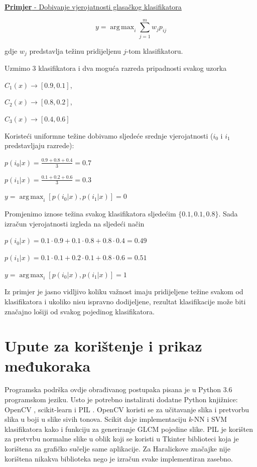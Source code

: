 \documentclass[times, utf8, zavrsni, numeric]{fer}
\DeclareMathOperator*{\argmax}{arg\,max}
\begin{document}
\newpage

\underline{\textbf{Primjer} - Dobivanje vjerojatnosti glasačkog klasifikatora}

\[y = \argmax_i \sum_{j=1}^mw_jp_{ij}\]

gdje \(w_j\) predstavlja težinu pridijeljenu \(j\)-tom klasifikatoru.

\bigbreak

Uzmimo 3 klasifikatora i dva moguća razreda pripadnosti svakog uzorka 

\begin{center}
\(C_1(x) \rightarrow [0.9,0.1]\),
\end{center}
\begin{center}
\(C_2(x) \rightarrow [0.8,0.2]\),
\end{center}
\begin{center}
\(C_3(x) \rightarrow [0.4,0.6]\)
\end{center}

Koristeći uniformne težine dobivamo sljedeće srednje vjerojatnosti (\(i_0\) i \(i_1\) predstavljaju razrede):
\begin{center}
\(p(i_0|x)=\frac{0.9+0.8+0.4}{3}=0.7\)

\(p(i_1|x)=\frac{0.1+0.2+0.6}{3}=0.3\)

\(y=\argmax_i [p(i_0|x),p(i_1|x)]=0\)
\end{center}

Promjenimo iznose težina svakog klasifikatora sljedećim \(\{0.1,0.1,0.8\}\). Sada izračun
vjerojatnosti izgleda na sljedeći način

\begin{center}
\(p(i_0|x) = 0.1 \cdot 0.9 + 0.1 \cdot 0.8 + 0.8 \cdot 0.4 = 0.49\)

\(p(i_1|x) = 0.1 \cdot 0.1 + 0.2 \cdot 0.1 + 0.8 \cdot 0.6 = 0.51\)

\(y=\argmax_i [p(i_0|x),p(i_1|x)]=1\)
\end{center}

Iz primjer je jasno vidljivo koliku važnost imaju pridijeljene težine svakom od
klasifikatora i ukoliko nisu ispravno dodijeljene, rezultat klasifikacije može
biti značajno lošiji od svakog pojedinog klasifikatora.



\chapter{Upute za korištenje i prikaz međukoraka}

Programska podrška ovdje obrađivanog postupaka pisana je u Python 3.6 
programskom jeziku. Usto je potrebno instalirati dodatne Python 
knjižnice: OpenCV \citep{opencv.org}, scikit-learn \citep{scikit} i PIL \citep{pil}.
OpenCV koristi se za učitavanje slika i pretvorbu slika u boji u slike sivih tonova. Scikit 
daje implementaciju \textit{k}-NN i SVM klasifikatora kako i funkciju za generiranje 
GLCM pojedine slike. PIL je korišten za pretvrbu normalne slike u oblik koji 
se koristi u Tkinter biblioteci koja je korištena za grafičko sučelje same aplikacije.
Za Haralickove značajke nije korištena nikakva biblioteka nego je izračun svake implementiran
zasebno.
\end{document}
